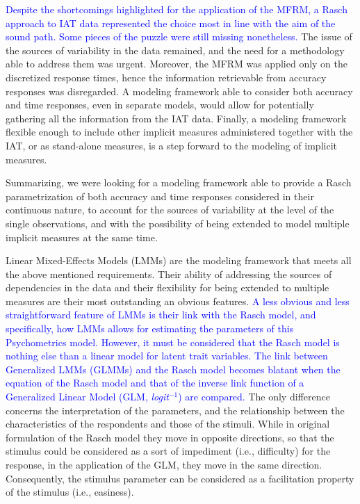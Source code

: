 \documentclass[12pt]{book}
\begin{document}
\textcolor{blue}{Despite the shortcomings highlighted for the application of the MFRM, a Rasch approach to IAT data represented the choice most in line with the aim of the sound path. 
Some pieces of the puzzle were still missing nonetheless.}
The issue of the sources of variability in the data remained, and the need for a methodology able to address them was urgent.
Moreover, the MFRM was applied only on the discretized response times, hence the information retrievable from accuracy responses was disregarded. 
A modeling framework able to consider both accuracy and time responses, even in separate models, would allow for potentially gathering  all the information from the IAT data.
Finally, a modeling framework flexible enough to include other implicit measures administered together with the IAT, or as stand-alone measures, is a step forward to the modeling of implicit measures. 

Summarizing, we were looking for a modeling framework able to provide a Rasch parametrization of both accuracy and time responses considered in their continuous nature, to account for the sources of variability at the level of the single observations, and with the possibility of being extended to model multiple implicit measures at the same time.

Linear Mixed-Effects Models (LMMs) are the modeling framework that meets all the above mentioned requirements.
Their ability of addressing the sources of dependencies in the data and their flexibility for being extended to multiple measures are their most outstanding an obvious features.   
\textcolor{blue}{A less obvious and less straightforward feature of LMMs is their link with the Rasch model, and specifically, how LMMs allows for estimating the parameters of this Psychometrics model.} 
\textcolor{blue}{However, it must be considered that the Rasch model is nothing else than a linear model for latent trait variables. 
	The link between Generalized LMMs (GLMMs) and the Rasch model becomes blatant when the equation of the Rasch model and that of the inverse link function of a Generalized Linear Model (GLM, \emph{logit}$^{-1}$) are compared.}
The only difference concerns the interpretation of the parameters, and the relationship between the  characteristics of the respondents and those of the stimuli. 
While in original formulation of the Rasch model they move in opposite directions, so that the stimulus could be considered as a sort of impediment (i.e., difficulty) for the response, in the application of the GLM, they move in the same direction. Consequently, the stimulus parameter can be considered as a facilitation property of the stimulus (i.e., easiness). 
\end{document}
